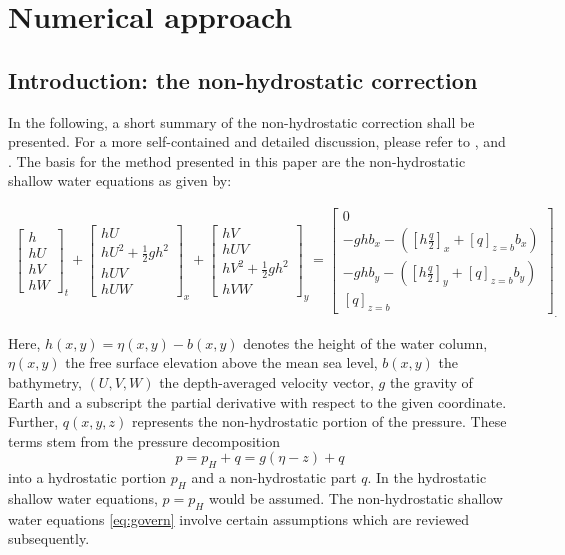 
\section{Numerical approach}
\subsection{Introduction: the non-hydrostatic correction}
In the following, a short summary of the non-hydrostatic correction shall be presented. For a more self-contained and detailed discussion, please refer to  \cite{samfass14extension}, \cite{cui} and \cite{fuchs}. The basis for the method presented in this paper are the non-hydrostatic shallow water equations as given by:

\begin{align}
\boxed{
{\begin{bmatrix}
h \\
hU\\
hV\\
hW
\end{bmatrix}}_{t}
+
{\begin{bmatrix}
hU \\
hU^2+\frac{1}{2}gh^2\\
hUV\\
hUW
\end{bmatrix}}_{x}
+
{\begin{bmatrix}
hV \\
hUV\\
hV^2+\frac{1}{2}gh^2\\
hVW
\end{bmatrix}}_{y}
=
{\begin{bmatrix}
0 \\
-ghb_x -\left([h \frac{q}{2}]_x+[q]_{z=b}b_x \right)\\
-ghb_y -\left([h \frac{q}{2}]_y+[q]_{z=b}b_y \right)\\
[q]_{z=b}
\end{bmatrix}_.}}
\label{eq:govern}
\end{align}

Here, $h (x,y)=\eta (x,y) -b(x,y)$ denotes the height of the water column, $\eta (x,y)$ the free surface elevation above the mean sea level, $b (x,y)$ the bathymetry, $(U,V,W)$ the depth-averaged velocity vector, $g$ the gravity of Earth and a subscript the partial derivative with respect to the given coordinate. Further, $q (x,y,z)$ represents the non-hydrostatic portion of the pressure. These terms stem from the pressure decomposition
\begin{equation}
p= p_H + q = g (\eta -z) +q
\end{equation}
into a hydrostatic portion $p_H$ and a non-hydrostatic part $q$. In the hydrostatic shallow water equations, $p=p_H$ would be assumed. The non-hydrostatic shallow water equations \ref{eq:govern} involve certain assumptions which are reviewed subsequently.

